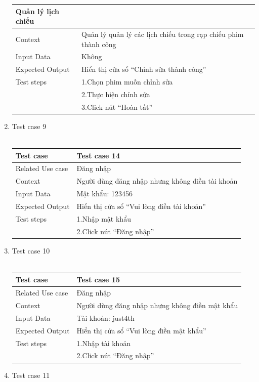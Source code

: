 \documentclass[a4paper, 12pt]{article}
\begin{document}
\begin{enumerate}
\begin{tabular}{|l|l|}
			Quản lý lịch chiếu\\
			\hline
			Context&
			Quản lý quản lý các lịch chiếu trong rạp chiếu phim thành công\\
			\hline
			Input Data&
			Không\\
			\hline
			Expected Output&
			Hiển thị cửa sổ “Chỉnh sửa thành công”\\
			\hline
			Test steps&
			1.Chọn phim muốn chỉnh sửa\\&
			2.Thực hiện chỉnh sửa\\&
			3.Click nút “Hoàn tất”\\			
			\hline
		\end{tabular}
		\item Test case 9\\\\
		\begin{tabular}{|l|l|}
			\hline
			Test case&
			Test case 14\\
			\hline
			Related Use case&
			Đăng nhập\\
			\hline
			Context&
			Người dùng đăng nhập nhưng không điền tài khoản\\
			\hline
			Input Data&
			Mật khẩu: 123456\\
			\hline
			Expected Output&
			Hiển thị cửa sổ “Vui lòng điền tài khoản”\\
			\hline
			Test steps&
			1.Nhập mật khẩu\\&
			2.Click nút “Đăng nhập”\\				
			\hline
		\end{tabular}
		\item Test case 10\\\\
		\begin{tabular}{|l|l|}
			\hline
			Test case&
			Test case 15\\
			\hline
			Related Use case&
			Đăng nhập\\
			\hline
			Context&
			Người dùng đăng nhập nhưng không điền mật khẩu\\
			\hline
			Input Data&
			Tài khoản: just4th\\
			\hline
			Expected Output&
			Hiển thị cửa sổ “Vui lòng điền mật khẩu”\\
			\hline
			Test steps&
			1.Nhập tài khoản\\&
			2.Click nút “Đăng nhập”\\				
			\hline
		\end{tabular}
		\item Test case 11\\\\

\end{enumerate}
\end{document}
